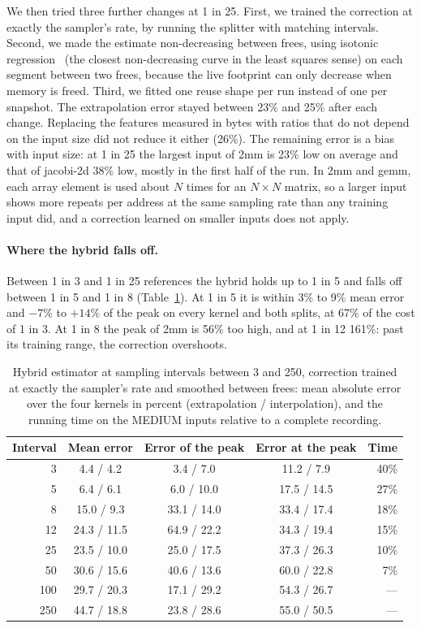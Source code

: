 \documentclass[11pt]{article}
\newcommand{\tabref}[1]{Table~\ref{#1}}
\begin{document}
We then tried three further changes at 1 in 25. First, we trained the correction at exactly the sampler's rate, by running the splitter with matching intervals. Second, we made the estimate non-decreasing between frees, using isotonic regression~\cite{barlow1972isotonic} (the closest non-decreasing curve in the least squares sense) on each segment between two frees, because the live footprint can only decrease when memory is freed. Third, we fitted one reuse shape per run instead of one per snapshot. The extrapolation error stayed between 23\% and 25\% after each change. Replacing the features measured in bytes with ratios that do not depend on the input size did not reduce it either (26\%). The remaining error is a bias with input size: at 1 in 25 the largest input of 2mm is 23\% low on average and that of jacobi-2d 38\% low, mostly in the first half of the run. In 2mm and gemm, each array element is used about $N$ times for an $N \times N$ matrix, so a larger input shows more repeats per address at the same sampling rate than any training input did, and a correction learned on smaller inputs does not apply.

\paragraph{Where the hybrid falls off.}
Between 1 in 3 and 1 in 25 references the hybrid holds up to 1 in 5 and falls off between 1 in 5 and 1 in 8 (\tabref{tab:hybrid}). At 1 in 5 it is within 3\% to 9\% mean error and $-7\%$ to $+14\%$ of the peak on every kernel and both splits, at 67\% of the cost of 1 in 3. At 1 in 8 the peak of 2mm is 56\% too high, and at 1 in 12 161\%: past its training range, the correction overshoots.

\begin{table}[t]
\centering
\small
\caption{Hybrid estimator at sampling intervals between 3 and 250, correction trained at exactly the sampler's rate and smoothed between frees: mean absolute error over the four kernels in percent (extrapolation / interpolation), and the running time on the MEDIUM inputs relative to a complete recording.}
\label{tab:hybrid}
\begin{tabular}{rcccr}
\toprule
Interval & Mean error & Error of the peak & Error at the peak & Time \\
\midrule
3 & 4.4 / 4.2 & 3.4 / 7.0 & 11.2 / 7.9 & 40\% \\
5 & 6.4 / 6.1 & 6.0 / 10.0 & 17.5 / 14.5 & 27\% \\
8 & 15.0 / 9.3 & 33.1 / 14.0 & 33.4 / 17.4 & 18\% \\
12 & 24.3 / 11.5 & 64.9 / 22.2 & 34.3 / 19.4 & 15\% \\
25 & 23.5 / 10.0 & 25.0 / 17.5 & 37.3 / 26.3 & 10\% \\
50 & 30.6 / 15.6 & 40.6 / 13.6 & 60.0 / 22.8 & 7\% \\
100 & 29.7 / 20.3 & 17.1 / 29.2 & 54.3 / 26.7 & — \\
250 & 44.7 / 18.8 & 23.8 / 28.6 & 55.0 / 50.5 & — \\
\bottomrule
\end{tabular}
\end{table}
\end{document}

